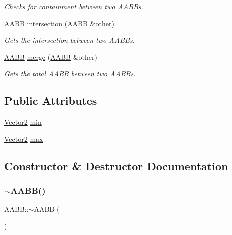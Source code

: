 \begin{DoxyCompactItemize}
\begin{DoxyCompactList}\small\item\em Checks for containment between two A\+A\+B\+Bs. \end{DoxyCompactList}\item 
\mbox{\hyperlink{class_a_a_b_b}{A\+A\+BB}} \mbox{\hyperlink{class_a_a_b_b_a0d4565bf10f3d1aa18cee2bd471f198e}{intersection}} (\mbox{\hyperlink{class_a_a_b_b}{A\+A\+BB}} \&other)
\begin{DoxyCompactList}\small\item\em Gets the intersection between two A\+A\+B\+Bs. \end{DoxyCompactList}\item 
\mbox{\hyperlink{class_a_a_b_b}{A\+A\+BB}} \mbox{\hyperlink{class_a_a_b_b_a19109a399dbd65308a7c4dfd1c4728be}{merge}} (\mbox{\hyperlink{class_a_a_b_b}{A\+A\+BB}} \&other)
\begin{DoxyCompactList}\small\item\em Gets the total \mbox{\hyperlink{class_a_a_b_b}{A\+A\+BB}} between two A\+A\+B\+Bs. \end{DoxyCompactList}\end{DoxyCompactItemize}
\subsection*{Public Attributes}
\begin{DoxyCompactItemize}
\item 
\mbox{\hyperlink{struct_vector2}{Vector2}} \mbox{\hyperlink{class_a_a_b_b_a6e0ad742511375d51f29f84c599b411d}{min}}
\item 
\mbox{\hyperlink{struct_vector2}{Vector2}} \mbox{\hyperlink{class_a_a_b_b_ad14f0a02aba39bcba965b15524921401}{max}}
\end{DoxyCompactItemize}


\subsection{Constructor \& Destructor Documentation}
\mbox{\label{class_a_a_b_b_afd5f4956a2043597167ff66821f7b223}} 
\subsubsection{\texorpdfstring{$\sim$AABB()}{~AABB()}}
{\footnotesize\ttfamily A\+A\+B\+B\+::$\sim$\+A\+A\+BB (\begin{DoxyParamCaption}{ }\end{DoxyParamCaption})\hspace{0.3cm}{\ttfamily [inline]}}

